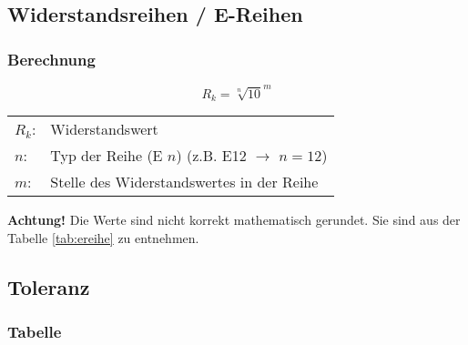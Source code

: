 



\subsection{Widerstandsreihen / E-Reihen}
\subsubsection{Berechnung}
\[ R_k = {\sqrt[n]{10}}^m \]
\begin{tabular}{@{}ll}
$R_k$: & Widerstandswert \\
$n$:   & Typ der Reihe (E $n$) (z.B. E12 $\rightarrow$ $n=12$) \\
$m$:   & Stelle des Widerstandswertes in der Reihe \\
\end{tabular}
\textbf{Achtung!} Die Werte sind nicht korrekt mathematisch gerundet. Sie sind 
aus der Tabelle \ref{tab:ereihe} zu entnehmen. 

\subsection{Toleranz}

\subsubsection{Tabelle}
